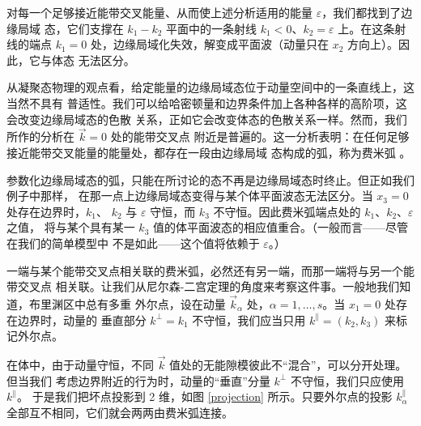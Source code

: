 \documentclass[11pt,a4paper]{article}
\numberwithin{equation}{section}
\def\veps{\varepsilon}
\begin{document}
对每一个足够接近能带交叉能量、从而使上述分析适用的能量 $\veps$，我们都找到了边缘局域
态，它们支撑在 $k_1-k_2$ 平面中的一条射线 $k_1< 0$、$k_2=\veps$ 上。在这条射线的端点
$k_1=0$ 处，边缘局域化失效，解变成平面波（动量只在 $x_2$ 方向上）。因此，它与体态
无法区分。

从凝聚态物理的观点看，给定能量的边缘局域态位于动量空间中的一条直线上，这当然不具有
普适性。我们可以给哈密顿量和边界条件加上各种各样的高阶项，这会改变边缘局域态的色散
关系，正如它会改变体态的色散关系一样。然而，我们所作的分析在 $\vec k=0$ 处的能带交叉点
附近是普遍的。这一分析表明：在任何足够接近能带交叉能量的能量处，都存在一段由边缘局域
态构成的弧，称为费米弧 \cite{WTVS}。

参数化边缘局域态的弧，只能在所讨论的态不再是边缘局域态时终止。但正如我们例子中那样，
在那一点上边缘局域态变得与某个体平面波态无法区分。当 $x_3=0$ 处存在边界时，$k_1$、
$k_2$ 与 $\veps$ 守恒，而 $k_3$ 不守恒。因此费米弧端点处的 $k_1$、$k_2$、$\veps$ 之值，
将与某个具有某一 $k_3$ 值的体平面波态的相应值重合。（一般而言——尽管在我们的简单模型中
不是如此——这个值将依赖于 $\veps$。）

一端与某个能带交叉点相关联的费米弧，必然还有另一端，而那一端将与另一个能带交叉点
相关联。让我们从尼尔森-二宫定理的角度来考察这件事。一般地我们知道，布里渊区中总有多重
外尔点，设在动量 $\vec k_\alpha$ 处，$\alpha=1,\dots,s$。当 $x_1=0$ 处存在边界时，动量的
垂直部分 $k^\perp=k_1$ 不守恒，我们应当只用 $k^\parallel=(k_2,k_3)$ 来标记外尔点。

在体中，由于动量守恒，不同 $\vec k$ 值处的无能隙模彼此不“混合”，可以分开处理。但当我们
考虑边界附近的行为时，动量的“垂直”分量 $k^\perp$ 不守恒，我们只应使用 $k^\parallel$。
于是我们把坏点投影到 2 维，如图 \ref{projection} 所示。只要外尔点的投影
$k_\alpha^\parallel$ 全部互不相同，它们就会两两由费米弧连接。
\end{document}
